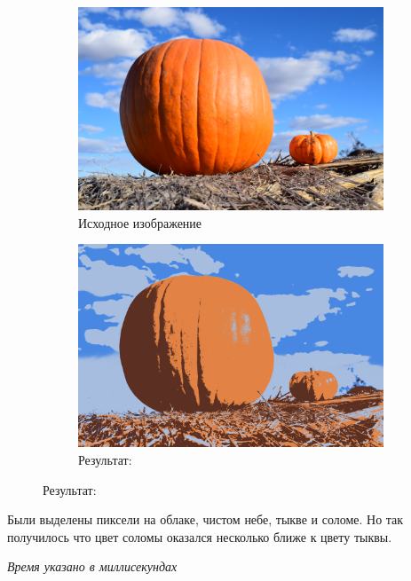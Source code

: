 \documentclass[12pt]{article}
\begin{document}
\begin{figure}[!tbh]
	\caption*{Большое изображение: 6000x4000}
	\begin{subfigure}{0.49\textwidth}
		\centering
		\caption*{Исходное изображение}
		\includegraphics[scale=0.79]{pp.png}
	\end{subfigure}
	\begin{subfigure}{0.49\textwidth}
		\centering
		\caption*{Результат:}
		\includegraphics[scale=0.038]{pumpkin-result.png}
	\end{subfigure}
\end{figure}

Были выделены пиксели на облаке, чистом небе, тыкве и соломе.
Но так получилось что цвет соломы оказался несколько ближе к цвету тыквы.

\newpage

\textit{Время указано в миллисекундах}
\end{document}
